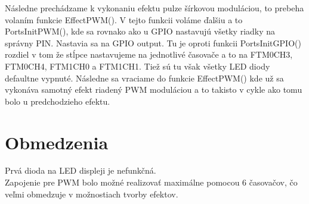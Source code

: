 \documentclass[a4paper,11pt]{article}
\begin{document}
 
 Následne prechádzame k vykonaniu efektu pulze šírkovou moduláciou, to prebeha volaním funkcie EffectPWM(). V tejto funkcii voláme ďalšiu a to PortsInitPWM(), kde sa rovnako ako u GPIO nastavujú všetky riadky na správny PIN. Nastavia sa na GPIO output. Tu je oproti funkcii PortsInitGPIO() rozdiel v tom že stĺpce nastavujeme na jednotlivé časovače a to na FTM0CH3, FTM0CH4, FTM1CH0 a FTM1CH1. Tiež sú tu však všetky LED diody defaultne vypnuté. Následne sa vraciame do funkcie EffectPWM() kde už sa vykonáva samotný efekt riadený PWM moduláciou a to takisto v cykle ako tomu bolo u predchodzieho efektu.

\section{Obmedzenia}
Prvá dioda na LED displeji je nefunkčná. \\Zapojenie pre PWM bolo možné realizovať maximálne pomocou 6 časovačov, čo veľmi obmedzuje v možnostiach tvorby efektov.

\newpage
\end{document}
